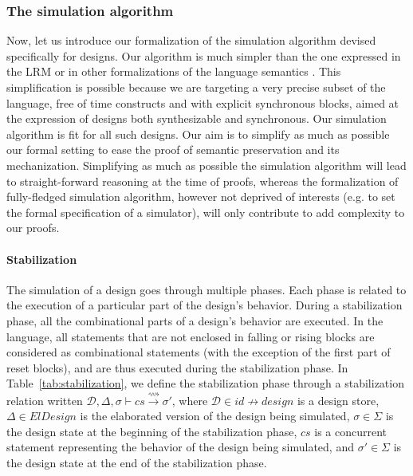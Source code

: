 \documentclass[pdflatex,sn-mathphys]{sn-jnl}%
\theoremstyle{thmstyleone}%
\theoremstyle{thmstyletwo}%
\theoremstyle{thmstylethree}%
\begin{document}
\subsubsection{The simulation algorithm}
\label{subsubsec:sim-algo}

Now, let us introduce our formalization of the simulation algorithm
devised specifically for \hvhdl{} designs. Our algorithm is much
simpler than the one expressed in the \vhdl{} LRM \cite{VHDL2000} or in
other formalizations of the \vhdl{} language
semantics \cite{Borger1995}. This simplification is possible because we
are targeting a very precise subset of the language, free of time
constructs and with explicit synchronous blocks, aimed at the
expression of designs both synthesizable and synchronous. Our
simulation algorithm is fit for all such designs. Our aim is to
simplify as much as possible our formal setting to ease the proof of
semantic preservation and its mechanization. Simplifying as much as
possible the simulation algorithm will lead to straight-forward
reasoning at the time of proofs, whereas the formalization of
fully-fledged simulation algorithm, however not deprived of interests
(e.g. to set the formal specification of a \vhdl{} simulator), will
only contribute to add complexity to our proofs.

\paragraph{Stabilization}

The simulation of a \hvhdl{} design goes through multiple phases. Each
phase is related to the execution of a particular part of the design's
behavior. During a stabilization phase, all the combinational parts of
a design's behavior are executed. In the \hvhdl{} language, all
statements that are not enclosed in falling or rising blocks are
considered as combinational statements (with the exception of the
first part of reset blocks), and are thus executed during the
stabilization phase. In Table~\ref{tab:stabilization}, we define the
stabilization phase through a stabilization relation written
$\mathcal{D},\Delta,\sigma\vdash{}cs\xrightarrow{\rightsquigarrow}\sigma'$,
where $\mathcal{D}\in{}id\nrightarrow{}design$ is a design store,
$\Delta\in{}ElDesign$ is the elaborated version of the design being
simulated, $\sigma\in{}\Sigma$ is the design state at the beginning of
the stabilization phase, $cs$ is a concurrent statement representing
the behavior of the design being simulated, and $\sigma'\in\Sigma$ is
the design state at the end of the stabilization phase.
\end{document}
